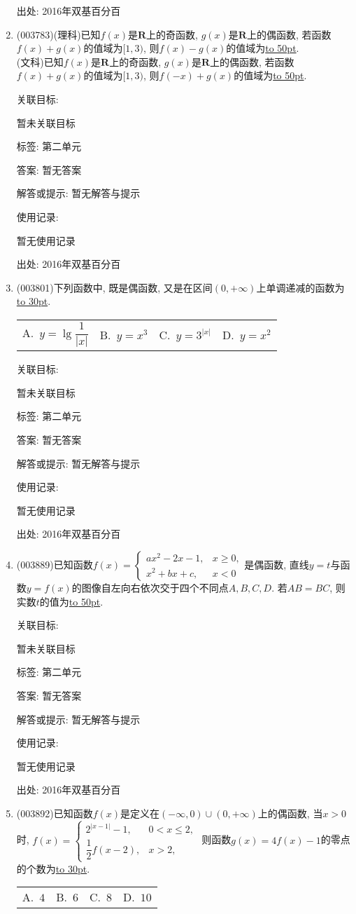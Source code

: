\documentclass[10pt,a4paper]{article}
\newcommand{\blank}[1]{\underline{\hbox to #1pt{}}}
\newcommand{\fourch}[4]{\par\begin{tabular}{p{.23\textwidth}p{.23\textwidth}p{.23\textwidth}p{.23\textwidth}}
A.~#1 &B.~#2& C.~#3& D.~#4
\end{tabular}}
\begin{document}
\begin{enumerate}[1.]
出处: 2016年双基百分百
\item { (003783)}(理科)已知$f(x)$是$\mathbf{R}$上的奇函数, $g(x)$是$\mathbf{R}$上的偶函数, 若函数$f(x)+g(x)$的值域为$[1,3)$, 则$f(x)-g(x)$的值域为\blank{50}.\\
(文科)已知$f(x)$是$\mathbf{R}$上的奇函数, $g(x)$是$\mathbf{R}$上的偶函数, 若函数$f(x)+g(x)$的值域为$[1,3)$, 则$f(-x)+g(x)$的值域为\blank{50}.


关联目标:

暂未关联目标



标签: 第二单元

答案: 暂无答案

解答或提示: 暂无解答与提示

使用记录:

暂无使用记录


出处: 2016年双基百分百
\item { (003801)}下列函数中, 既是偶函数, 又是在区间$(0,+\infty)$上单调递减的函数为\blank{30}.
\fourch{$y=\lg\dfrac{1}{|x|}$}{$y=x^3$}{$y=3^{|x|}$}{$y=x^2$}


关联目标:

暂未关联目标



标签: 第二单元

答案: 暂无答案

解答或提示: 暂无解答与提示

使用记录:

暂无使用记录


出处: 2016年双基百分百
\item { (003889)}已知函数$f(x)=\begin{cases}ax^2-2x-1, & x\ge 0,\\ x^2+bx+c, & x<0\end{cases}$是偶函数, 直线$y=t$与函数$y=f(x)$的图像自左向右依次交于四个不同点$A,B,C,D$. 若$AB=BC$, 则实数$t$的值为\blank{50}.


关联目标:

暂未关联目标



标签: 第二单元

答案: 暂无答案

解答或提示: 暂无解答与提示

使用记录:

暂无使用记录


出处: 2016年双基百分百
\item { (003892)}已知函数$f(x)$是定义在$(-\infty,0)\cup (0,+\infty)$上的偶函数, 当$x>0$时, $f(x)=\begin{cases}
2^{|x-1|}-1, & 0<x\le 2,\\\dfrac 12f(x-2), & x>2,
\end{cases}$ 则函数$g(x)=4f(x)-1$的零点的个数为\blank{30}.
\fourch{$4$}{$6$}{$8$}{$10$}



\end{enumerate}
\end{document}
